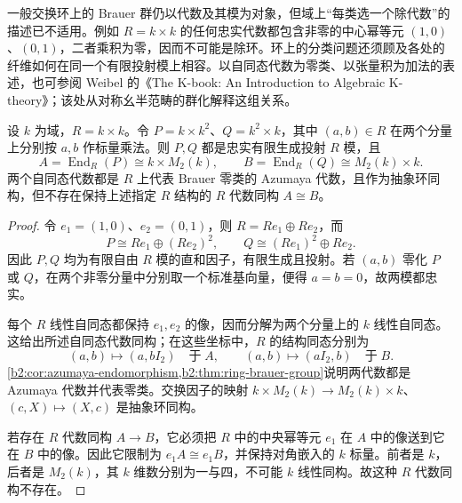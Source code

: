 \ProseParagraphBreak
一般交换环上的 Brauer 群仍以代数及其模为对象，但域上“每类选一个除代数”的描述已不适用。例如 \(R=k\times k\) 的任何忠实代数都包含非零的中心幂等元 \((1,0)\)、\((0,1)\)，二者乘积为零，因而不可能是除环。环上的分类问题还须顾及各处的纤维如何在同一个有限投射模上相容。以自同态代数为零类、以张量积为加法的表述，也可参阅 Weibel 的《The K-book: An Introduction to Algebraic K-theory》\cite[Chapter II, Example 5.4.3]{Weibel2013KBook}；该处从对称幺半范畴的群化解释这组关系。

\begin{proposition}\label{b2:prop:C-base-algebra-structure}
	设 \(k\) 为域，\(R=k\times k\)。令 \(P=k\times k^2\)、\(Q=k^2\times k\)，其中 \((a,b)\in R\) 在两个分量上分别按 \(a,b\) 作标量乘法。则 \(P,Q\) 都是忠实有限生成投射 \(R\) 模，且
	\[
		A=\operatorname{End}_R(P)\cong k\times M_2(k), \qquad B=\operatorname{End}_R(Q)\cong M_2(k)\times k.
	\]
	两个自同态代数都是 \(R\) 上代表 Brauer 零类的 Azumaya 代数，且作为抽象环同构，但不存在保持上述指定 \(R\) 结构的 \(R\) 代数同构 \(A\cong B\)。
\end{proposition}
\begin{proof}
	令 \(e_1=(1,0)\)、\(e_2=(0,1)\)，则 \(R=Re_1\oplus Re_2\)，而
	\[
		P\cong Re_1\oplus (Re_2)^2, \qquad Q\cong (Re_1)^2\oplus Re_2.
	\]
	因此 \(P,Q\) 均为有限自由 \(R\) 模的直和因子，有限生成且投射。若 \((a,b)\) 零化 \(P\) 或 \(Q\)，在两个非零分量中分别取一个标准基向量，便得 \(a=b=0\)，故两模都忠实。

	每个 \(R\) 线性自同态都保持 \(e_1,e_2\) 的像，因而分解为两个分量上的 \(k\) 线性自同态。这给出所述自同态代数同构；在这些坐标中，\(R\) 的结构同态分别为
	\[
		(a,b)\longmapsto(a,bI_2)\quad\text{于}\;A, \qquad (a,b)\longmapsto(aI_2,b)\quad\text{于}\;B.
	\]
	\cref{b2:cor:azumaya-endomorphism,b2:thm:ring-brauer-group}说明两代数都是 Azumaya 代数并代表零类。交换因子的映射 \(k\times M_2(k)\rightarrow M_2(k)\times k\)、\((c,X)\mapsto(X,c)\) 是抽象环同构。

	若存在 \(R\) 代数同构 \(A\rightarrow B\)，它必须把 \(R\) 中的中央幂等元 \(e_1\) 在 \(A\) 中的像送到它在 \(B\) 中的像。因此它限制为 \(e_1A\cong e_1B\)，并保持对角嵌入的 \(k\) 标量。前者是 \(k\)，后者是 \(M_2(k)\)，其 \(k\) 维数分别为一与四，不可能 \(k\) 线性同构。故这种 \(R\) 代数同构不存在。
\end{proof}

